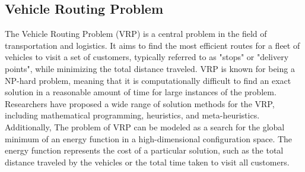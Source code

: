 \subsection{Vehicle Routing Problem}\label{subsec:vehicle-routing-problem}

The Vehicle Routing Problem (VRP) is a central problem in the field of transportation and logistics.
It aims to find the most efficient routes for a fleet of vehicles to visit a set of customers,
typically referred to as "stops" or "delivery points", while minimizing the total distance traveled.
VRP is known for being a NP-hard problem, meaning that it is computationally difficult to find an exact solution
in a reasonable amount of time for large instances of the problem.
Researchers have proposed a wide range of solution methods for the VRP, including mathematical programming, heuristics,
and meta-heuristics.
Additionally, The problem of VRP can be modeled as a search for the global
minimum of an energy function in a high-dimensional configuration space.
The energy function represents the cost of a particular solution, such as the total distance traveled by the
vehicles or the total time taken to visit all customers.

